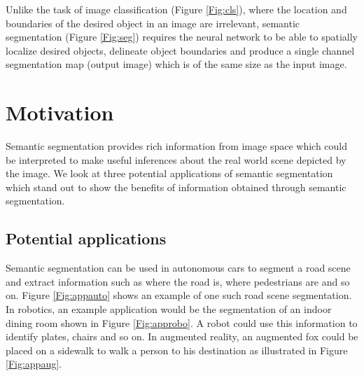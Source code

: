 Unlike the task of image classification (Figure \ref{Fig:cls}), where the location and boundaries of the desired object in an image are irrelevant, semantic segmentation (Figure \ref{Fig:seg}) requires the neural network to be able to spatially localize desired objects, delineate object boundaries and produce a single channel segmentation map (output image) which is of the same size as the input image.

\section{Motivation}

Semantic segmentation provides rich information from image space which could be interpreted to make useful inferences about the real world scene depicted by the image. We look at three potential applications of semantic segmentation which stand out to show the benefits of information obtained through semantic segmentation. 

\subsection{Potential applications}

Semantic segmentation can be used in autonomous cars to segment a road scene and extract information such as where the road is, where pedestrians are and so on. Figure \ref{Fig:appauto} shows an example of one such road scene segmentation. In robotics, an example application would be the segmentation of an indoor dining room shown in Figure \ref{Fig:approbo}. A robot could use this information to identify plates, chairs and so on. In augmented reality, an augmented fox could be placed on a sidewalk to walk a person to his destination as illustrated in Figure \ref{Fig:appaug}. 

